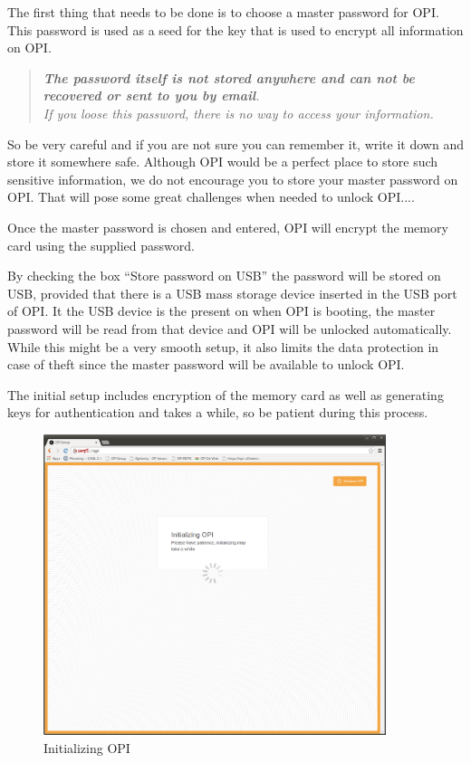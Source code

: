 \documentclass[12pt,a4paper,titlepage]{article}
\begin{document}
The first thing that needs to be done is to choose a master password for OPI. This password is used as a seed for the key that is used to encrypt all information on OPI.

\begin{quote}
\emph{\textbf{The password itself is not stored anywhere and can not be recovered or sent to you by email}.\\
If you loose this password, there is no way to access your information.}
\end{quote}

So be very careful and if you are not sure you can remember it, write it down and store it somewhere safe. Although OPI would be a perfect place to store such sensitive information, we do not encourage you to store your master password on OPI.
That will pose some great challenges when needed to unlock OPI....

Once the master password is chosen and entered, OPI will encrypt the memory card using the supplied password.

By checking the box ``Store password on USB'' the password will be stored on USB, provided that there is a USB mass storage device inserted in the USB port of OPI. It the USB device is the present on when OPI is booting, the master password will be read from that device and OPI will be unlocked automatically. While this might be a very smooth setup, it also limits the data protection in case of theft since the master password will be available to unlock OPI.

The initial setup includes encryption of the memory card as well as generating keys for authentication and takes a while, so be patient during this process.
\begin{figure}[h!]
\centering
\includegraphics[width=10cm]{./img/init}
\caption{Initializing OPI}
\end{figure}
\end{document}
